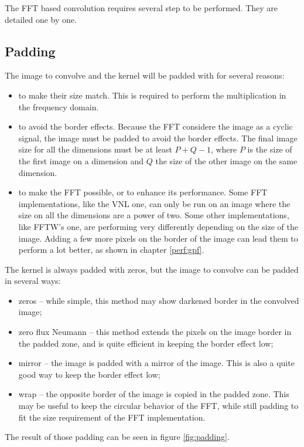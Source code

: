 \documentclass{InsightArticle}
\begin{document}
The FFT based convolution requires several step to be performed. They are detailed one by one.

\subsection{Padding}

The image to convolve and the kernel will be padded with for several reasons:
\begin{itemize}
  \item to make their size match. This is required to perform the multiplication in the frequency
  domain.
  \item  to avoid the border effects. Because the FFT considere the image as a cyclic signal, the
  image must be padded to avoid the border effects. The final image size for all the dimensions
  must be at least $P+Q-1$, where $P$ is the size of the first image on a dimension and $Q$ the size
  of the other image on the same dimension.
  \item to make the FFT possible, or to enhance its performance. Some FFT implementations, like the
  VNL one, can only be run on an image where the size on all the dimensions are a power of two.
  Some other implementations, like FFTW's one, are performing very differently depending on the
  size of the image. Adding a few more pixels on the border of the image can lead them to perform
  a lot better, as shown in chapter \ref{perf:gpf}.
\end{itemize}

The kernel is always padded with zeros, but the image to convolve can be padded in several ways:
\begin{itemize}
 \item zeros -- while simple, this method may show darkened border in the convolved image;
 \item zero flux Neumann -- this method extends the pixels on the image border in the padded zone, and
       is quite efficient in keeping the border effect low;
 \item mirror -- the image is padded with a mirror of the image. This is also a quite good way to
       keep the border effect low;
 \item wrap -- the opposite border of the image is copied in the padded zone. This may be useful to
       keep the circular behavior of the FFT, while still padding to fit the size requirement of the
       FFT implementation.
\end{itemize}
The result of those padding can be seen in figure \ref{fig:padding}.
\end{document}
